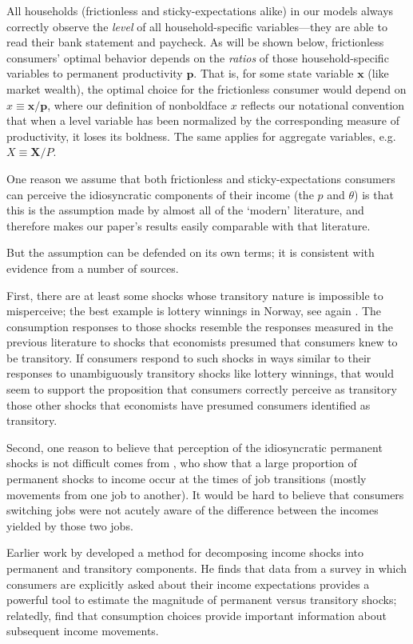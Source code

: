 \documentclass[titlepage]{article}
\begin{document}
All households (frictionless and sticky-expectations alike) in our models always correctly observe the \textit{level} of all household-specific variables---they are able to read their bank statement and paycheck. As will be shown below, frictionless consumers' optimal behavior depends on the {\it ratios} of those household-specific variables to permanent productivity $\pmb{p}$.  That is, for some state variable $\textbf{x}$ (like market wealth), the optimal choice for the frictionless consumer would depend on ${x} \equiv \mathbf{x}/{\pmb{p}}$, where our definition of nonboldface ${x}$ reflects our notational convention that when a level variable has been normalized by the corresponding measure of productivity, it loses its boldness.  The same applies for aggregate variables, e.g.\ ${X} \equiv \mathbf{X}/{P}$.

One reason we assume that both frictionless and sticky-expectations consumers can perceive the idiosyncratic components of their income (the $p$ and $\theta$) is that this is the assumption made by almost all of the `modern' literature, and therefore makes our paper's results easily comparable with that literature.

But the assumption can be defended on its own terms; it is consistent with evidence from a number of sources.

First, there are at least some shocks whose transitory nature is impossible to misperceive; the best example is lottery winnings in Norway, see again \cite{fhnMPC}.  The consumption responses to those shocks resemble the responses measured in the previous literature to shocks that economists presumed that consumers knew to be transitory.  If consumers respond to such shocks in ways similar to their responses to unambiguously transitory shocks like lottery winnings, that would seem to support the proposition that consumers correctly perceive as transitory those other shocks that economists have presumed consumers identified as transitory.

Second, one reason to believe that perception of the idiosyncratic permanent shocks is not difficult comes from \cite{lmpPermShocks}, who show that a large proportion of permanent shocks to income occur at the times of job transitions (mostly movements from one job to another).  It would be hard to believe that consumers switching jobs were not acutely aware of the difference between the incomes yielded by those two jobs.

Earlier work by \cite{pistaferriSuperior} developed a method for decomposing income shocks into permanent and transitory components.  He finds that data from a survey in which consumers are explicitly asked about their income expectations provides a powerful tool to estimate the magnitude of permanent versus transitory shocks; relatedly, \cite{gsInferring} find that consumption choices provide important information about subsequent income movements.
\end{document}
